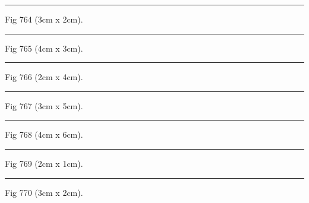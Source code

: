\documentclass[a4paper,11pt]{article}
\begin{document}
\begin{swarmwrap}%
  \begin{minipage}[t]{3cm}
    \centering
    \rule{\linewidth}{2cm}
    {\footnotesize Fig 764 (3cm x 2cm).}
  \end{minipage}%
\end{swarmwrap}%
\swarmwrapnext
\lipsum[14]%

\begin{swarmwrap}%
  \begin{minipage}[t]{4cm}
    \centering
    \rule{\linewidth}{3cm}
    {\footnotesize Fig 765 (4cm x 3cm).}
  \end{minipage}%
\end{swarmwrap}%
\swarmwrapnext
\lipsum[15]%

\begin{swarmwrap}%
  \begin{minipage}[t]{2cm}
    \centering
    \rule{\linewidth}{4cm}
    {\footnotesize Fig 766 (2cm x 4cm).}
  \end{minipage}%
\end{swarmwrap}%
\swarmwrapnext
\lipsum[16]%

\begin{swarmwrap}%
  \begin{minipage}[t]{3cm}
    \centering
    \rule{\linewidth}{5cm}
    {\footnotesize Fig 767 (3cm x 5cm).}
  \end{minipage}%
\end{swarmwrap}%
\swarmwrapnext
\lipsum[17]%

\begin{swarmwrap}%
  \begin{minipage}[t]{4cm}
    \centering
    \rule{\linewidth}{6cm}
    {\footnotesize Fig 768 (4cm x 6cm).}
  \end{minipage}%
\end{swarmwrap}%
\swarmwrapnext
\lipsum[18]%

\begin{swarmwrap}%
  \begin{minipage}[t]{2cm}
    \centering
    \rule{\linewidth}{1cm}
    {\footnotesize Fig 769 (2cm x 1cm).}
  \end{minipage}%
\end{swarmwrap}%
\swarmwrapnext
\lipsum[19]%

\begin{swarmwrap}%
  \begin{minipage}[t]{3cm}
    \centering
    \rule{\linewidth}{2cm}
    {\footnotesize Fig 770 (3cm x 2cm).}
  \end{minipage}%
\end{swarmwrap}%
\swarmwrapnext
\lipsum[20]%
\end{document}
